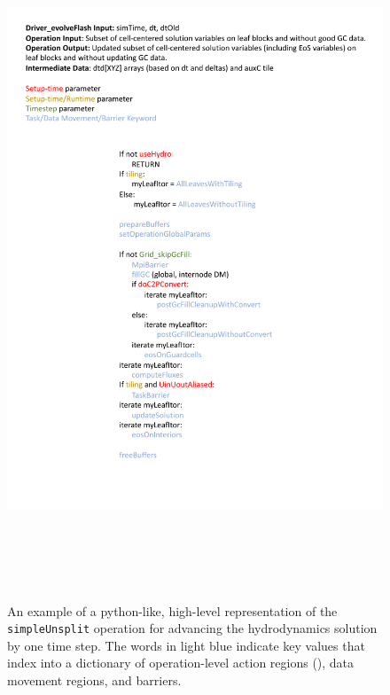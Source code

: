 \documentclass{article}
\begin{document}
\begin{figure}[!hp]
\begin{center}
\includegraphics[height=8.0in]{simpleUnsplitAlgo.pdf}
\caption[]{An example of a python-like, high-level representation of the
\texttt{simpleUnsplit} operation for advancing the hydrodynamics solution by one
time step.  The words in light blue indicate key values that index into a
dictionary of operation-level action regions (\OLARs), data movement regions, and barriers.}
\label{fig:simpleUnsplitAlgo}
\end{center}
\end{figure}
\end{document}
